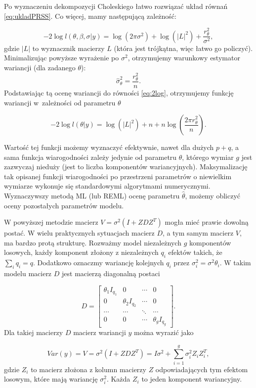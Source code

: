 \documentclass[12pt]{mwbk}
\theoremstyle{plain}
\theoremstyle{definition}
\theoremstyle{definition}
\begin{document}
Po wyznaczeniu dekompozycji Choleskiego łatwo rozwiązać układ równań \ref{eq:ukladPRSS}. Co więcej, mamy następującą zależność:

\begin{equation} \label{eq:2log}
-2\log l(\theta,\beta,\sigma|y)=\log(2\pi \sigma^2)+\log(|L|^2) +\frac{r^2_{\theta}}{\sigma^2}, 
\end{equation}
gdzie $|L|$ to wyznacznik macierzy $L$ (która jest trójkątna, więc łatwo go policzyć). Minimalizując powyższe wyrażenie po $\sigma^2$, otrzymujemy warunkowy estymator wariancji (dla zadanego $\theta$):
$$\hat{\sigma}_{\theta}^2=\frac{r^2_{\theta}}{n}.$$
Podstawiając tą ocenę wariancji do równości \ref{eq:2log}, otrzymujemy funkcję wariancji w~zależności od parametru $\theta$

$$-2 \log l(\theta|y)=\log(|L|^2)+n+n\log\left(\frac{2\pi r^2_{\theta}}{n}\right).$$

Wartość tej funkcji możemy wyznaczyć efektywnie, nawet dla dużych $p+q$, a sama funkcja wiarogodności zależy jedynie od parametru $\theta$, którego wymiar $g$ jest zazwyczaj nieduży (jest to liczba komponentów wariancyjnych). Maksymalizację tak opisanej funkcji wiarogodności po przestrzeni parametrów o niewielkim wymiarze wykonuje się standardowymi algorytmami numerycznymi.
Wyznaczywszy metodą ML (lub REML) ocenę parametru $\hat{\theta}$, możemy obliczyć oceny pozostałych parametrów modelu. 

W powyższej metodzie macierz $V=\sigma^2(I+ZDZ^T)$ mogła mieć prawie dowolną postać. W wielu praktycznych sytuacjach macierz $D$, a tym samym macierz $V$, ma bardzo protą strukturę.
Rozważmy model niezależnych $g$ komponentów losowych, każdy komponent złożony z niezależnych $q_i$ efektów takich, że $\sum\limits_i q_i=q$. Dodatkowo oznaczmy wariancję kolejnych $q_i$ przez $\sigma^2_i=\sigma^2\theta_i$. W takim modelu macierz $D$ jest macierzą diagonalną postaci

$$D=\begin{bmatrix}
\theta_1I_{q_1} & 0 & \cdots & 0 \\
0 & \theta_2I_{q_2} & \cdots & 0 \\
\cdots & \cdots & \ddots & \cdots \\
0 & 0 & \cdots & \theta_gI_{q_g}
\end{bmatrix}.$$
Dla takiej macierzy $D$ macierz wariancji $y$ można wyrazić jako

$$Var(y)=V=\sigma^2(I+ZDZ^T)=I\sigma^2+\sum_{i=1}^{g}\sigma_i^2Z_iZ_i^T,$$
gdzie $Z_i$ to macierz złożona z kolumn macierzy $Z$ odpowiadających tym efektom losowym, które mają wariancję $\sigma^2_i$. Każda $Z_i$ to jeden komponent wariancyjny.
\end{document}
